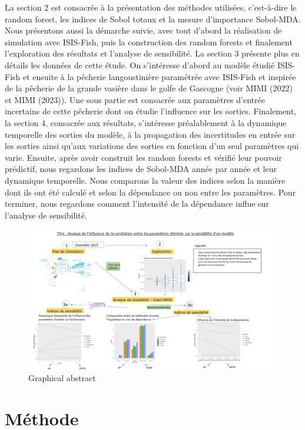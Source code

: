 \documentclass[
]{article}
\begin{document}
La section 2 est consacrée à la présentation des méthodes utilisées,
c'est-à-dire le random forest, les indices de Sobol totaux et la mesure
d'importance Sobol-MDA. Nous présentons aussi la démarche suivie, avec
tout d'abord la réalisation de simulation avec ISIS-Fish, puis la
construction des random forests et finalement l'exploration des
résultats et l'analyse de sensibilité. La section 3 présente plus en
détails les données de cette étude. On s'intéresse d'abord au modèle
étudié ISIS-Fish et ensuite à la pêcherie langoustinière paramétrée avec
ISIS-Fish et inspirée de la pêcherie de la grande vasière dans le golfe
de Gascogne (voir MIMI (2022) et MIMI (2023)). Une sous partie est
consacrée aux paramètres d'entrée incertains de cette pêcherie dont on
étudie l'influence sur les sorties. Finalement, la section 4, consacrée
aux résultats, s'intéresse préalablement à la dynamique temporelle des
sorties du modèle, à la propagation des incertitudes en entrée sur les
sorties ainsi qu'aux variations des sorties en fonction d'un seul
paramètres qui varie. Ensuite, après avoir construit les random forests
et vérifié leur pouvoir prédictif, nous regardons les indices de
Sobol-MDA année par année et leur dynamique temporelle. Nous comparons
la valeur des indices selon la manière dont ils ont été calculé et selon
la dépendance ou non entre les paramètres. Pour terminer, nous regardons
comment l'intensité de la dépendance influe sur l'analyse de
sensibilité.

\begin{figure}
\centering
\includegraphics{GraphicalAbstract.png}
\caption{Graphical abstract}
\end{figure}

\newpage

\hypertarget{muxe9thode}{%
\section{Méthode}\label{muxe9thode}}
\end{document}
